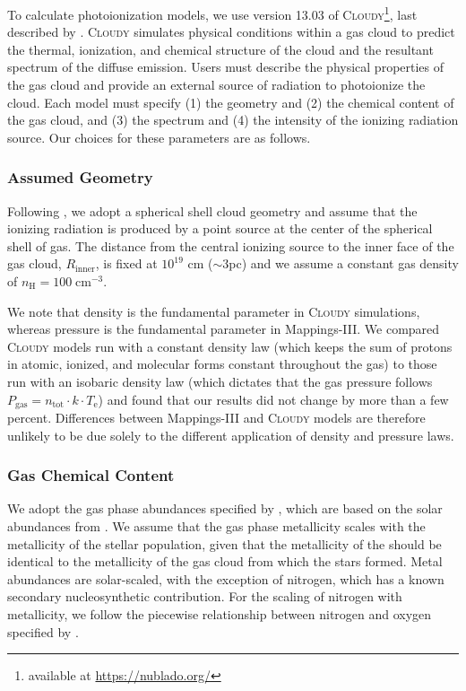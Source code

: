 \documentclass[linenumbers, trackchanges, tighten]{aastex61}%
\newcommand{\Mappings}{{\sc Mappings-III}\xspace}
\newcommand{\Cloudy}{\textsc{Cloudy}\xspace}
\newcommand{\nH}{\ensuremath{n_{\mathrm{H}}}}
\newcommand{\cm}[1]{\ensuremath{\mathrm{cm}^{#1}}}
\newcommand{\Rin}{\ensuremath{R_{\mathrm{inner}}}}
\begin{document}
To calculate photoionization models, we use version 13.03 of \Cloudy\footnote{available at \url{https://nublado.org/}}, last described by \citet{Ferland13}. \Cloudy simulates physical conditions within a gas cloud to predict the thermal, ionization, and chemical structure of the cloud and the resultant spectrum of the diffuse emission. Users must describe the physical properties of the gas cloud and provide an external source of radiation to photoionize the cloud. Each model must specify (1) the geometry and (2) the chemical content of the gas cloud, and (3) the spectrum and (4) the intensity of the ionizing radiation source. Our choices for these parameters are as follows.

\subsubsection{Assumed Geometry}\label{sec:methods:cloudy:geom}


Following \citet{CL01}, we adopt a spherical shell cloud geometry and assume that the ionizing radiation is produced by a point source at the center of the spherical shell of gas. The distance from the central ionizing source to the inner face of the gas cloud, \Rin{}, is fixed at $10^{19}$ cm ($\sim 3$pc) and we assume a constant gas density of $\nH=100\;$\cm{-3}.

We note that density is the fundamental parameter in \Cloudy simulations, whereas pressure is the fundamental parameter in \Mappings. We compared \Cloudy models run with a constant density law (which keeps the sum of protons in atomic, ionized, and molecular forms constant throughout the gas) to those run with an isobaric density law (which dictates that the gas pressure follows $P_{\mathrm{gas}} = n_{\mathrm{tot}} \cdot k \cdot T_{\mathrm{e}}$) and found that our results did not change by more than a few percent. Differences between \Mappings and \Cloudy models are therefore unlikely to be due solely to the different application of density and pressure laws.

\subsubsection{Gas Chemical Content}\label{sec:methods:cloudy:abund}

We adopt the gas phase abundances specified by \citet{Dopita00}, which are based on the solar abundances from \citet{AndersGrev89}. We assume that the gas phase metallicity scales with the metallicity of the stellar population, given that the metallicity of the  should be identical to the metallicity of the gas cloud from which the stars formed. Metal abundances are solar-scaled, with the exception of nitrogen, which has a known secondary nucleosynthetic contribution. For the scaling of nitrogen with metallicity, we follow the piecewise relationship between nitrogen and oxygen specified by \citet{Dopita00}.
\end{document}
